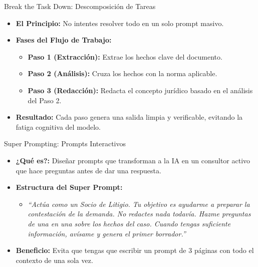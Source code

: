 \documentclass[aspectratio=169]{beamer}
\begin{document}
\begin{frame}[fragile]{Break the Task Down: Descomposición de Tareas}


\begin{itemize}
  \item \textbf{El Principio:} No intentes resolver todo en un solo prompt masivo.
  \item \textbf{Fases del Flujo de Trabajo:}
  \begin{itemize}
    \item \textbf{Paso 1 (Extracción):} Extrae los hechos clave del documento.
    \item \textbf{Paso 2 (Análisis):} Cruza los hechos con la norma aplicable.
    \item \textbf{Paso 3 (Redacción):} Redacta el concepto jurídico basado en el análisis del Paso 2.
  \end{itemize}
  \item \textbf{Resultado:} Cada paso genera una salida limpia y verificable, evitando la fatiga cognitiva del modelo.
\end{itemize}
\end{frame}



\begin{frame}[fragile]{Super Prompting: Prompts Interactivos}


\begin{itemize}
  \item \textbf{¿Qué es?:} Diseñar prompts que transforman a la IA en un consultor activo que hace preguntas antes de dar una respuesta.
  \item \textbf{Estructura del Super Prompt:}
  \begin{itemize}
    \item \textit{``Actúa como un Socio de Litigio. Tu objetivo es ayudarme a preparar la contestación de la demanda. No redactes nada todavía. Hazme preguntas de una en una sobre los hechos del caso. Cuando tengas suficiente información, avísame y genera el primer borrador.''}
  \end{itemize}
  \item \textbf{Beneficio:} Evita que tengas que escribir un prompt de 3 páginas con todo el contexto de una sola vez.
\end{itemize}
\end{frame}
\end{document}
